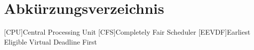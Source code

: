 \clearpage
\chapter*{Abkürzungsverzeichnis}	

\begin{acronym}[XXXXXXX]
	[CPU]{Central Processing Unit}
	[CFS]{Completely Fair Scheduler}
	[EEVDF]{Earliest Eligible Virtual Deadline First}
\end{acronym}